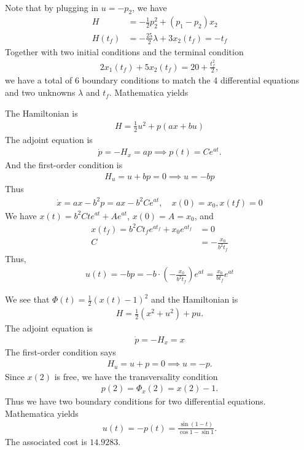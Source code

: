 \documentclass[12pt]{article}
\begin{document}
\begin{problem}[1]
\begin{enumerate}[label=(\alph*)]
\begin{align*}
\end{align*}
Note that by plugging in $ u=-p_2$, we have
\begin{align*}
	H &= -\frac{1}{2} p_2^2+(p_1-p_2)x_2\\
	H(t_f)&= -\frac{25}{2} \lambda + 3x_2(t_f) = -t_f 
\end{align*}
Together with two initial conditions and the terminal condition
\begin{align*}
	2x_1(t_f) +5x_2(t_f) = 20 + \frac{t_f^2}{ 2},
\end{align*}
we have a total of 6 boundary conditions to match the 4 differential equations and two unknowns $ \lambda$ and $ t_f$. Mathematica yields
\end{enumerate}
\end{problem}
\begin{problem}[2]
The Hamiltonian is
\begin{align*}
	H = \frac{1}{2} u^2 + p(ax+bu)
\end{align*}
The adjoint equation is
\begin{align*}
	\dot{p} = -H_x = ap \implies p(t) = C e^{at}.
\end{align*}
And the first-order condition is
\begin{align*}
	H_u = u+bp = 0 \implies u=-bp
\end{align*}
Thus
\begin{align*}
	\dot{x} = ax-b^2p = ax - b^2 C e^{at}, \quad x(0)=x_0,x(tf) = 0
\end{align*}
We have $ x(t) = b^2 C t e^{at} + A e^{at}$, $ x(0) = A = x_0$, and
\begin{align*}
	x(t_f) = b^2 C t_f e^{at_f} + x_0 e^{at_f} &= 0 \\
	C &= - \frac{x_0}{ b^2 t_f}
\end{align*}
Thus,
\begin{align*}
	u(t) = -bp = -b \cdot \left( - \frac{x_0}{b^2 t_f} \right) e^{at}  = \frac{x_0}{ b t_f} e^{at}
\end{align*}
\end{problem}
\begin{problem}[3]
We see that $ \Phi(t) = \frac{1}{2}(x(t)-1)^2$ and the Hamiltonian is
\begin{align*}
	H = \frac{1}{2} (x^2+u^2)+pu .
\end{align*}
The adjoint equation is
\begin{align*}
	\dot{p}= -H_x = x
\end{align*}
The first-order condition says
\begin{align*}
	H_u = u +p=0 \implies u = -p .
\end{align*}
Since $ x(2)$ is free, we have the transversality condition
 \begin{align*}
	p(2) = \Phi_x(2) = x(2)-1 .
\end{align*}
Thus we have two boundary conditions for two differential equations. Mathematica yields
\begin{align*}
	u(t) = -p(t) = \frac{\sin(1-t)}{\cos 1 - \sin 1 }.
\end{align*}
The associated cost is $ 14.9283$.
\end{problem}
\end{document}
